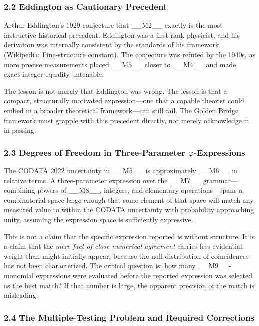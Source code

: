 \subsubsection{2.2 Eddington as Cautionary Precedent}

Arthur Eddington's 1929 conjecture that \_\_M2\_\_ exactly is the most instructive historical precedent. Eddington was a first-rank physicist, and his derivation was internally consistent by the standards of his framework (\href{https://en.wikipedia.org/wiki/Fine-structure\_constant}{Wikipedia: Fine-structure constant}). The conjecture was refuted by the 1940s, as more precise measurements placed \_\_M3\_\_ closer to \_\_M4\_\_ and made exact-integer equality untenable.

The lesson is not merely that Eddington was wrong. The lesson is that a compact, structurally motivated expression---one that a capable theorist could embed in a broader theoretical framework---can still fail. The Golden Bridge framework must grapple with this precedent directly, not merely acknowledge it in passing.

\subsubsection{2.3 Degrees of Freedom in Three-Parameter $\varphi$-Expressions}

The CODATA 2022 uncertainty in \_\_M5\_\_ is approximately \_\_M6\_\_ in relative terms. A three-parameter expression over the \_\_M7\_\_ grammar---combining powers of \_\_M8\_\_, integers, and elementary operations---spans a combinatorial space large enough that some element of that space will match any measured value to within the CODATA uncertainty with probability approaching unity, assuming the expression space is sufficiently expressive.

This is not a claim that the specific expression reported is without structure. It is a claim that the \textit{mere fact of close numerical agreement} carries less evidential weight than might initially appear, because the null distribution of coincidences has not been characterized. The critical question is: how many \_\_M9\_\_-monomial expressions were evaluated before the reported expression was selected as the best match? If that number is large, the apparent precision of the match is misleading.

\subsubsection{2.4 The Multiple-Testing Problem and Required Corrections}

